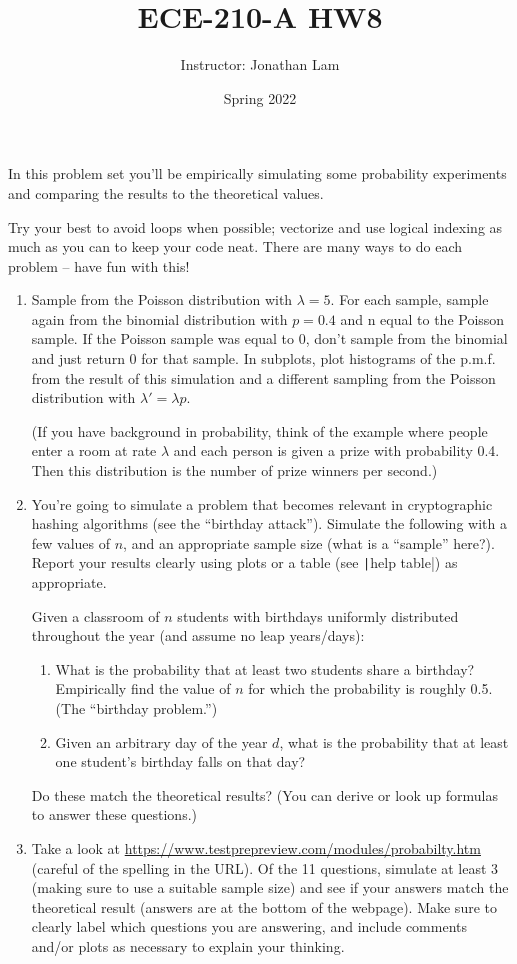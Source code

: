 \documentclass{article}
\title{ECE-210-A HW8}
\author{Instructor: Jonathan Lam}
\date{Spring 2022}
\begin{document}
\maketitle

\noindent In this problem set you'll be empirically simulating some probability experiments and comparing the results to the theoretical values.

Try your best to avoid loops when possible; vectorize and use logical indexing as much as you can to keep your code neat. There are many ways to do each problem -- have fun with this!

\begin{enumerate}
\item Sample from the Poisson distribution with $\lambda=5$. For each sample, sample
  again from the binomial distribution with $p=0.4$ and n equal to the Poisson
  sample. If the Poisson sample was equal to 0, don’t sample from the binomial
  and just return 0 for that sample. In subplots, plot histograms of the p.m.f.
  from the result of this simulation and a different sampling from the Poisson
  distribution with $\lambda'=\lambda p$.
  
  (If you have background in probability, think of the
  example where people enter a room at rate $\lambda$ and each person is given a prize
  with probability 0.4. Then this distribution is the number of prize
  winners per second.)
  
\item You're going to simulate a problem that becomes relevant in cryptographic hashing algorithms (see the ``birthday attack''). Simulate the following with a few values of $n$, and an appropriate sample size (what is a ``sample'' here?). Report your results clearly using plots or a table (see \texttt|help table|) as appropriate.
  
  Given a classroom of $n$ students with birthdays uniformly distributed throughout the year (and assume no leap years/days):
  
  \begin{enumerate}
  \item What is the probability that at least two students share a birthday? Empirically find the value of $n$ for which the probability is roughly 0.5. (The ``birthday problem.'')
    
  \item Given an arbitrary day of the year $d$, what is the probability that at least one student's birthday falls on that day?
  \end{enumerate}
  
  Do these match the theoretical results? (You can derive or look up formulas to answer these questions.)
  
  \clearpage
\item Take a look at \url{https://www.testprepreview.com/modules/probabilty.htm} (careful of the spelling in the URL). Of the 11 questions, simulate at least 3 (making sure to use a suitable sample size) and see if your answers match the theoretical result (answers are at the bottom of the webpage). Make sure to clearly label which questions you are answering, and include comments and/or plots as necessary to explain your thinking.
\end{enumerate}
\end{document}
